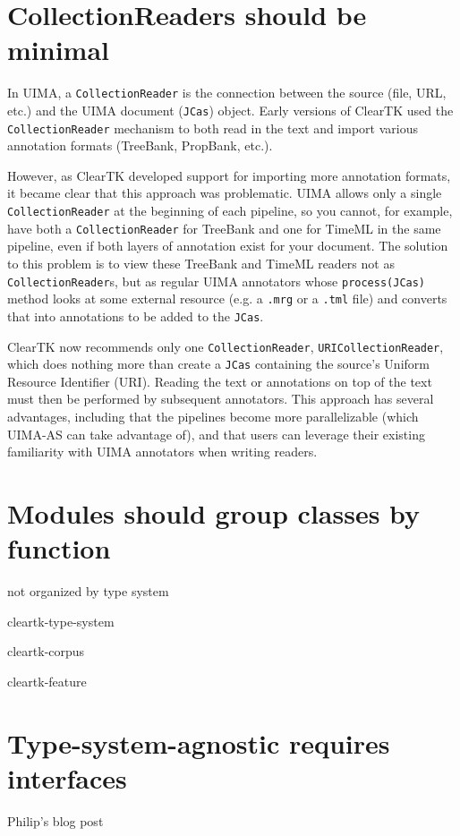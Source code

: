 \documentclass[10pt, a4paper]{article}
\newcommand{\code}[1]{\texttt{\small #1}}
\begin{document}
\section{CollectionReaders should be minimal}
In UIMA, a \code{CollectionReader} is the connection between the source (file, URL, etc.) and the UIMA document (\code{JCas}) object.
Early versions of ClearTK used the \code{CollectionReader} mechanism to both read in the text and import various annotation formats (TreeBank, PropBank, etc.).

However, as ClearTK developed support for importing more annotation formats, it became clear that this approach was problematic.
UIMA allows only a single \code{CollectionReader} at the beginning of each pipeline, so you cannot, for example, have both a \code{CollectionReader} for TreeBank and one for TimeML in the same pipeline, even if both layers of annotation exist for your document.
The solution to this problem is to view these TreeBank and TimeML readers not as \code{CollectionReader}s, but as regular UIMA annotators whose \code{process(JCas)} method looks at some external resource (e.g. a \code{.mrg} or a \code{.tml} file) and converts that into annotations to be added to the \code{JCas}.

ClearTK now recommends only one \code{CollectionReader}, \code{URICollectionReader}, which does nothing more than create a \code{JCas} containing the source's Uniform Resource Identifier (URI).
Reading the text or annotations on top of the text must then be performed by subsequent annotators.
This approach has several advantages, including that the pipelines become more parallelizable (which UIMA-AS can take advantage of), and that users can leverage their existing familiarity with UIMA annotators when writing readers.

\section{Modules should group classes by function}
not organized by type system

cleartk-type-system

cleartk-corpus

cleartk-feature


\section{Type-system-agnostic requires interfaces}

Philip's blog post
\end{document}
